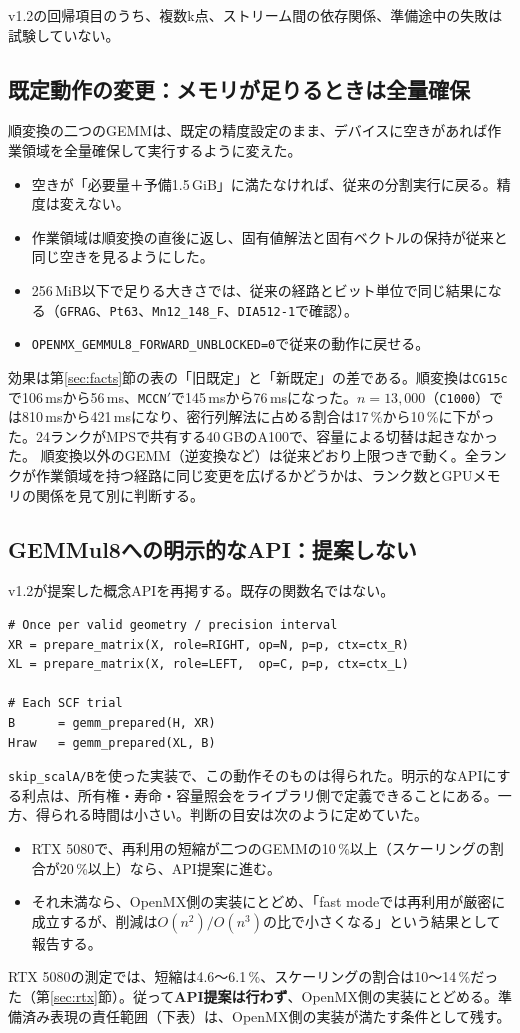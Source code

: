 \documentclass[a4paper,11pt]{ltjsarticle}
\newcommand{\code}[1]{\texttt{#1}}
\begin{document}
\medskip
v1.2の回帰項目のうち、複数k点、ストリーム間の依存関係、準備途中の失敗は試験していない。

\subsection{既定動作の変更：メモリが足りるときは全量確保}\label{sec:fullws}
順変換の二つのGEMMは、既定の精度設定のまま、デバイスに空きがあれば作業領域を全量確保して実行するように変えた。
\begin{itemize}
\item 空きが「必要量＋予備1.5\,GiB」に満たなければ、従来の分割実行に戻る。精度は変えない。
\item 作業領域は順変換の直後に返し、固有値解法と固有ベクトルの保持が従来と同じ空きを見るようにした。
\item 256\,MiB以下で足りる大きさでは、従来の経路とビット単位で同じ結果になる（\code{GFRAG}、\code{Pt63}、\code{Mn12\_148\_F}、\code{DIA512-1}で確認）。
\item \code{OPENMX\_GEMMUL8\_FORWARD\_UNBLOCKED=0}で従来の動作に戻せる。
\end{itemize}
効果は第\ref{sec:facts}節の表の「旧既定」と「新既定」の差である。順変換は\code{CG15c}で106\,msから56\,ms、\code{MCCN}$'$で145\,msから76\,msになった。$n=13{,}000$（\code{C1000}）では810\,msから421\,msになり、密行列解法に占める割合は17\,\%から10\,\%に下がった。24ランクがMPSで共有する40\,GBのA100で、容量による切替は起きなかった。 順変換以外のGEMM（逆変換など）は従来どおり上限つきで動く。全ランクが作業領域を持つ経路に同じ変更を広げるかどうかは、ランク数とGPUメモリの関係を見て別に判断する。

\subsection{GEMMul8への明示的なAPI：提案しない}\label{sec:api}
v1.2が提案した概念APIを再掲する。既存の関数名ではない。
\begin{lstlisting}
# Once per valid geometry / precision interval
XR = prepare_matrix(X, role=RIGHT, op=N, p=p, ctx=ctx_R)
XL = prepare_matrix(X, role=LEFT,  op=C, p=p, ctx=ctx_L)

# Each SCF trial
B      = gemm_prepared(H, XR)
Hraw   = gemm_prepared(XL, B)
\end{lstlisting}
\code{skip\_scalA/B}を使った実装で、この動作そのものは得られた。明示的なAPIにする利点は、所有権・寿命・容量照会をライブラリ側で定義できることにある。一方、得られる時間は小さい。判断の目安は次のように定めていた。
\begin{itemize}
\item RTX 5080で、再利用の短縮が二つのGEMMの10\,\%以上（スケーリングの割合が20\,\%以上）なら、API提案に進む。
\item それ未満なら、OpenMX側の実装にとどめ、「fast modeでは再利用が厳密に成立するが、削減は$O(n^2)/O(n^3)$の比で小さくなる」という結果として報告する。
\end{itemize}
RTX 5080の測定では、短縮は4.6〜6.1\,\%、スケーリングの割合は10〜14\,\%だった（第\ref{sec:rtx}節）。従って\textbf{API提案は行わず}、OpenMX側の実装にとどめる。準備済み表現の責任範囲（下表）は、OpenMX側の実装が満たす条件として残す。
\end{document}
